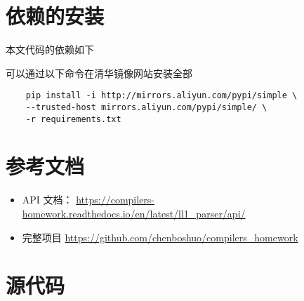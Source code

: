 \documentclass[pdfCover]{myreport} %
\begin{document}
\begin{appendices}
  \section{依赖的安装}
    本文代码的依赖如下
    
    可以通过以下命令在清华镜像网站安装全部
    \begin{lstlisting}
    pip install -i http://mirrors.aliyun.com/pypi/simple \
    --trusted-host mirrors.aliyun.com/pypi/simple/ \
    -r requirements.txt
    \end{lstlisting}
  \section{参考文档}
    \begin{itemize}
      \item API 文档： \url{https://compilers-homework.readthedocs.io/en/latest/ll1_parser/api/}
      \item 完整项目 \url{https://github.com/chenboshuo/compilers_homework}
    \end{itemize}
  \section{源代码}
    
\end{appendices}
\end{document}
